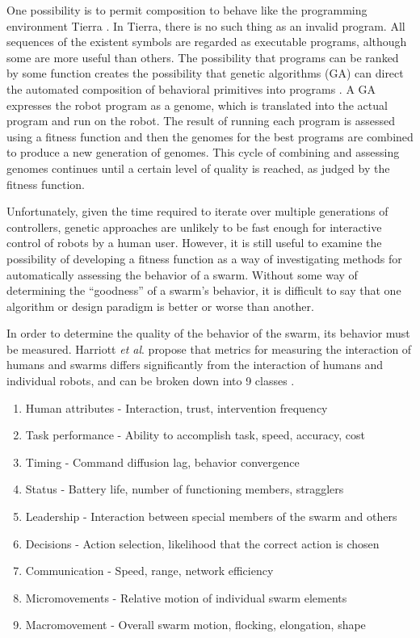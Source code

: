 One possibility is to permit composition to behave like the programming environment Tierra \citep{ray1991approach}.
In Tierra, there is no such thing as an invalid program. 
All sequences of the existent symbols are regarded as executable programs, although some are more useful than others. 
The possibility that programs can be ranked by some function creates the possibility that genetic algorithms (GA) can direct the automated composition of behavioral primitives into programs \citep{palmer2005emergence}.
A GA expresses the robot program as a genome, which is translated into the actual program and run on the robot. 
The result of running each program is assessed using a fitness function and then the genomes for the best programs are combined to produce a new generation of genomes. 
This cycle of combining and assessing genomes continues until a certain level of quality is reached, as judged by the fitness function.

Unfortunately, given the time required to iterate over multiple generations of controllers, genetic approaches are unlikely to be fast enough for interactive control of robots by a human user. 
However, it is still useful to examine the possibility of developing a fitness function as a way of investigating methods for automatically assessing the behavior of a swarm.
Without some way of determining the ``goodness'' of a swarm's behavior, it is difficult to say that one algorithm or design paradigm is better or worse than another. 

In order to determine the quality of the behavior of the swarm, its behavior must be measured.
Harriott \emph{et al}. propose that metrics for measuring the interaction of humans and swarms differs significantly from the interaction of humans and individual robots, and can be broken down into 9 classes \citep{harriott2014biologically}. 
\begin{enumerate}[noitemsep]
\item Human attributes - Interaction, trust, intervention frequency 
\item Task performance - Ability to accomplish task, speed, accuracy, cost
\item Timing - Command diffusion lag, behavior convergence
\item Status - Battery life, number of functioning members, stragglers
\item Leadership - Interaction between special members of the swarm and others
\item Decisions - Action selection, likelihood that the correct action is chosen
\item Communication - Speed, range, network efficiency
\item Micromovements - Relative motion of individual swarm elements
\item Macromovement - Overall swarm motion, flocking, elongation, shape 
\end{enumerate}


